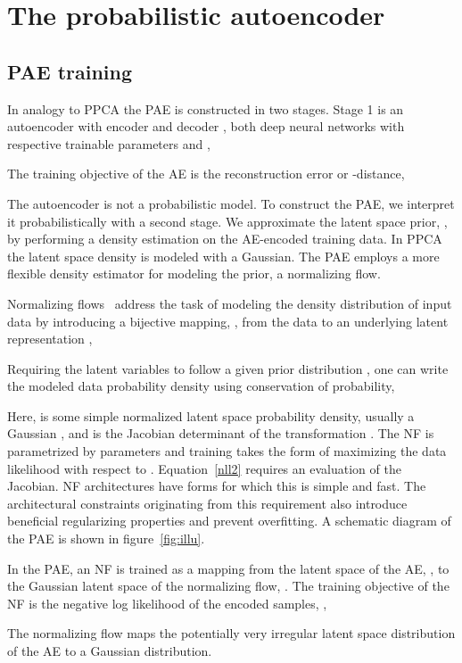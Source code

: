 \documentclass[10pt]{article} \usepackage[accepted]{tmlr}
\begin{document}
\section{The probabilistic autoencoder}

\subsection{PAE training}
In analogy to PPCA the PAE is constructed in two stages. Stage 1 is an autoencoder with encoder  and decoder , both deep neural networks with respective trainable parameters  and ,

The training objective of the AE is the reconstruction error or -distance,

The autoencoder is not a probabilistic model. To construct the PAE, we interpret it probabilistically with a second stage.
We approximate the latent space prior, , by performing a density estimation on the AE-encoded training data. In PPCA the latent space density is modeled with a Gaussian. The PAE employs a more flexible density estimator for modeling the prior, a normalizing flow.

Normalizing flows~\citep{RippelAdams13,DinhKB14,DinhSB16,glow,ffjord18} address the task of modeling the density distribution  of input data  by introducing a bijective mapping, , from the data  
to an underlying latent representation ,

Requiring the latent variables to follow a given prior distribution , one can write the modeled data 
probability density using 
conservation of probability,

Here,  is some simple normalized latent space 
probability density, usually a Gaussian ,  and  is the Jacobian determinant of the transformation .  The NF is parametrized by parameters  and training takes the form of 
maximizing the data likelihood 
with respect to . Equation~\ref{nll2} requires an evaluation of the Jacobian. NF architectures have forms for which this is simple and fast. The architectural constraints originating from this requirement also introduce beneficial regularizing properties and prevent overfitting. A schematic diagram of the PAE is shown in figure~\ref{fig:illu}.

In the PAE, an NF is trained as a mapping from the latent space of the AE, , to the Gaussian latent space of the normalizing flow, .
The training objective of the NF is the negative log likelihood of the encoded samples, ,

The normalizing flow maps the potentially very irregular latent space distribution of the AE to a Gaussian distribution. 
\end{document}
